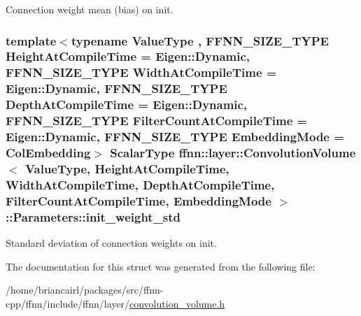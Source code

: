 Connection weight mean (bias) on init. 

\hypertarget{structffnn_1_1layer_1_1_convolution_volume_1_1_parameters_a1e9fca459e2666e545cae3eaa809a7a7}{
\subsubsection[{init\-\_\-weight\-\_\-std}]{\setlength{\rightskip}{0pt plus 5cm}template$<$typename Value\-Type , F\-F\-N\-N\-\_\-\-S\-I\-Z\-E\-\_\-\-T\-Y\-P\-E Height\-At\-Compile\-Time = Eigen\-::\-Dynamic, F\-F\-N\-N\-\_\-\-S\-I\-Z\-E\-\_\-\-T\-Y\-P\-E Width\-At\-Compile\-Time = Eigen\-::\-Dynamic, F\-F\-N\-N\-\_\-\-S\-I\-Z\-E\-\_\-\-T\-Y\-P\-E Depth\-At\-Compile\-Time = Eigen\-::\-Dynamic, F\-F\-N\-N\-\_\-\-S\-I\-Z\-E\-\_\-\-T\-Y\-P\-E Filter\-Count\-At\-Compile\-Time = Eigen\-::\-Dynamic, F\-F\-N\-N\-\_\-\-S\-I\-Z\-E\-\_\-\-T\-Y\-P\-E Embedding\-Mode = Col\-Embedding$>$ {\bf Scalar\-Type} {\bf ffnn\-::layer\-::\-Convolution\-Volume}$<$ Value\-Type, Height\-At\-Compile\-Time, Width\-At\-Compile\-Time, Depth\-At\-Compile\-Time, Filter\-Count\-At\-Compile\-Time, {\bf Embedding\-Mode} $>$\-::Parameters\-::init\-\_\-weight\-\_\-std}}\label{structffnn_1_1layer_1_1_convolution_volume_1_1_parameters_a1e9fca459e2666e545cae3eaa809a7a7}


Standard deviation of connection weights on init. 



The documentation for this struct was generated from the following file\-:\begin{DoxyCompactItemize}
\item 
/home/briancairl/packages/src/ffnn-\/cpp/ffnn/include/ffnn/layer/\hyperlink{convolution__volume_8h}{convolution\-\_\-volume.\-h}\end{DoxyCompactItemize}

